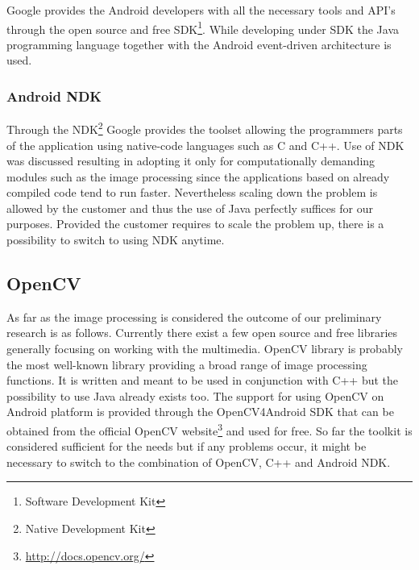 Google provides the Android developers with all the necessary tools and API's through the open source and free SDK\footnote{Software Development Kit}. While developing under SDK the Java programming language together with the Android event-driven architecture is used.

\subsubsection{Android NDK}

Through the NDK\footnote{Native Development Kit} Google provides the toolset allowing the programmers parts of the application using native-code languages such as C and C++.
Use of NDK was discussed resulting in adopting it only for computationally demanding modules such as the image processing since the applications based on already compiled code tend to run faster.
Nevertheless scaling down the problem is allowed by the customer and thus the use of Java perfectly suffices for our purposes.
Provided the customer requires to scale the problem up, there is a possibility to switch to using NDK anytime.


\subsection{OpenCV} \label{subsec:image_processing_library}

As far as the image processing is considered the outcome of our preliminary research is as follows.
Currently there exist a few open source and free libraries generally focusing on working with the multimedia.
OpenCV library is probably the most well-known library providing a broad range of image processing functions.
It is written and meant to be used in conjunction with C++ but the possibility to use Java already exists too.
The support for using OpenCV on Android platform is provided through the OpenCV4Android SDK that can be obtained from the official OpenCV website\footnote{\url{http://docs.opencv.org/}} and used for free.
So far the toolkit is considered sufficient for the needs but if any problems occur, it might be necessary to switch to the combination of OpenCV, C++ and Android NDK.


